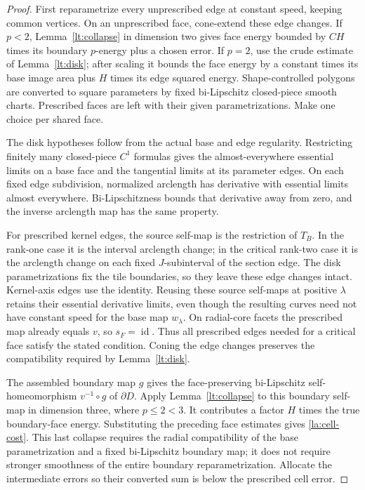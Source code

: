 \documentclass[11pt]{article}
\numberwithin{equation}{section}
\theoremstyle{definition}
\theoremstyle{remark}
\begin{document}
\begin{proof}
First reparametrize every unprescribed edge at constant speed,
keeping common vertices.  On an unprescribed face, cone-extend these
edge changes.  If $p<2$, Lemma~\ref{lt:collapse} in dimension two gives
face energy bounded by $CH$ times its boundary $p$-energy plus a
chosen error.  If $p=2$, use the crude estimate of
Lemma~\ref{lt:disk}; after scaling it bounds the face energy by a
constant times its base image area plus $H$ times its edge squared
energy.  Shape-controlled polygons are converted to square
parameters by fixed bi-Lipschitz closed-piece smooth charts.
Prescribed faces are left with their given parametrizations.  Make
one choice per shared face.

The disk hypotheses follow from the actual base and edge regularity.
Restricting finitely many closed-piece $C^1$ formulas gives the
almost-everywhere essential limits on a base face and the tangential
limits at its parameter edges.  On each fixed edge subdivision,
normalized arclength has derivative with essential limits almost
everywhere.  Bi-Lipschitzness bounds that derivative away from zero,
and the inverse arclength map has the same property.

For prescribed kernel edges, the source self-map is the restriction
of $T_B$.  In the rank-one case it is the interval arclength change;
in the critical rank-two case it is the arclength change on each fixed
$J$-subinterval of the section edge.  The disk parametrizations fix the
tile boundaries, so they leave these edge changes intact.  Kernel-axis
edges use the identity.  Reusing these source self-maps at positive
$\lambda$ retains their essential derivative limits, even though the
resulting curves need not have constant speed for the base map
$w_\lambda$.  On radial-core facets the prescribed map already equals
$v$, so $s_F=\operatorname{id}$.  Thus all prescribed edges needed for a critical
face satisfy the stated condition.  Coning the edge changes preserves the
compatibility required by Lemma~\ref{lt:disk}.

The assembled boundary map $g$ gives the face-preserving bi-Lipschitz
self-homeomorphism $v^{-1}\circ g$ of $\partial D$.  Apply
Lemma~\ref{lt:collapse} to this boundary self-map in dimension three,
where $p\le2<3$.
It contributes a factor $H$ times the true boundary-face energy.
Substituting the preceding face estimates gives
\eqref{la:cell-cost}.  This last collapse requires the radial
compatibility of the base parametrization and a fixed bi-Lipschitz
boundary map; it does not require stronger smoothness of the entire
boundary reparametrization.  Allocate the intermediate errors so
their converted sum is below the prescribed cell error.
\end{proof}
\end{document}
